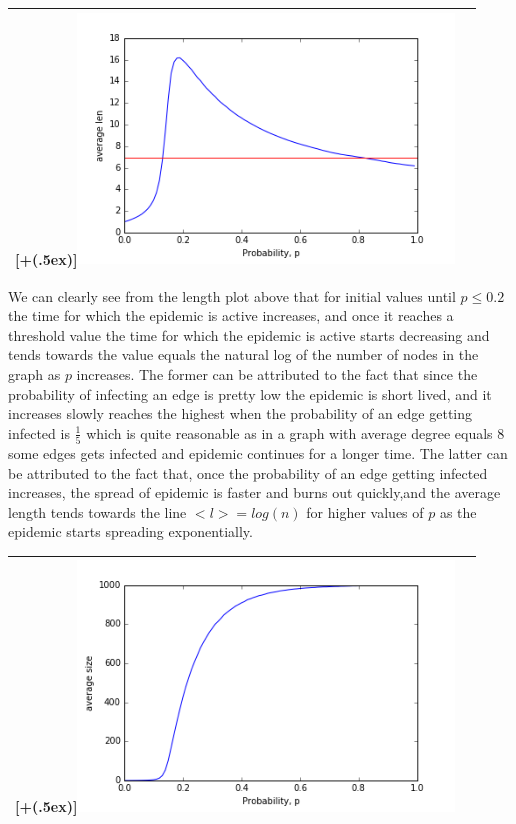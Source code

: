 \documentclass{article}
\newcommand*{\addheight}[2][.5ex]{%
  \raisebox{0pt}[\dimexpr\height+(#1)\relax]{#2}%
}
\begin{document}
\begin{enumerate}[label=(\alph*)]
\begin{table}[H]
\centering
\begin{tabular}{|c|c|}
	\hline
	\addheight{\includegraphics[width=100mm]{images/len.png}} \\
	\hline
\end{tabular}
\end{table}

We can clearly see from the length plot above that for initial values until $p \leq 0.2$ the time for which the epidemic is active increases, and once it reaches a threshold value the time for which the epidemic is active starts decreasing and tends towards the value equals the natural log of the number of nodes in the graph as $p$ increases. The former can be attributed to the fact that since the probability of infecting an edge is pretty low the epidemic is short lived, and it increases slowly reaches the highest when the probability of an edge getting infected is $\frac{1}{5}$ which is quite reasonable as in a graph with average degree equals 8 some edges gets infected and epidemic continues for a longer time. The latter can be attributed to the fact that, once the probability of an edge getting infected increases, the spread of epidemic is faster and burns out quickly,and the average length tends towards the line $<l> = log(n)$ for higher values of $p$ as the epidemic starts spreading exponentially.

\begin{table}[H]
\centering
\begin{tabular}{|c|c|}
	\hline
	\addheight{\includegraphics[width=100mm]{images/size.png}} \\
	\hline
\end{tabular}
\end{table}


\end{enumerate}
\end{document}
